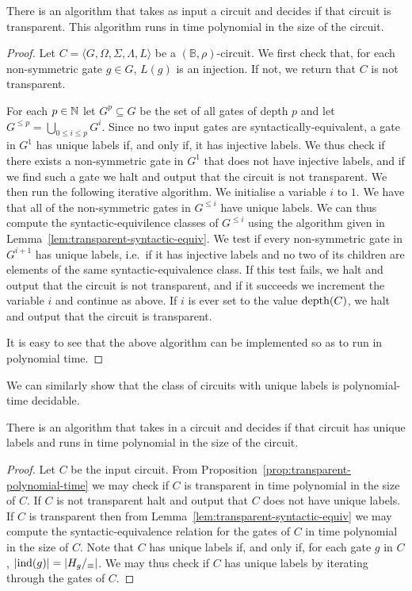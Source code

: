 \documentclass[../paper.tex]{subfiles}
\begin{document}
\begin{prop}
  There is an algorithm that takes as input a circuit and decides if that
  circuit is transparent. This algorithm runs in time polynomial in the size of
  the circuit.
  \label{prop:transparent-polynomial-time}
\end{prop}
\begin{proof}
  Let $C = \langle G, \Omega, \Sigma, \Lambda, L \rangle$ be a $(\mathbb{B},
  \rho)$-circuit. We first check that, for each non-symmetric gate $g \in G$,
  $L(g)$ is an injection. If not, we return that $C$ is not transparent.

  For each $p \in \mathbb{N}$ let $G^p \subseteq G$ be the set of all gates of depth
  $p$ and let $G^{\leq p} = \bigcup_{0 \leq i \leq p}G^i$. Since no two input
  gates are syntactically-equivalent, a gate in $G^1$ has unique labels if, and
  only if, it has injective labels. We thus check if there exists a
  non-symmetric gate in $G^1$ that does not have injective labels, and if we
  find such a gate we halt and output that the circuit is not transparent. We
  then run the following iterative algorithm. We initialise a variable $i$ to
  $1$. We have that all of the non-symmetric gates in $G^{\leq i}$ have unique
  labels. We can thus compute the syntactic-equivilence classes of $G^{\leq i}$
  using the algorithm given in Lemma~\ref{lem:transparent-syntactic-equiv}. We
  test if every non-symmetric gate in $G^{i+1}$ has unique labels, i.e.\ if
  it has injective labels and no two of its children are elements of the same
  syntactic-equivalence class. If this test fails, we halt and output that the
  circuit is not transparent, and if it succeeds we increment the variable $i$ and
  continue as above. If $i$ is ever set to the value $\text{depth}(C)$, we halt and
  output that the circuit is transparent.

  It is easy to see that the above algorithm can be implemented so as to run in
  polynomial time.
\end{proof}

We can similarly show that the class of circuits with unique labels is
polynomial-time decidable.

\begin{cor}
  There is an algorithm that takes in a circuit and decides if that circuit has
  unique labels and runs in time polynomial in the size of the circuit.
  \label{cor:unique-labels-polynomial-time}
\end{cor}
\begin{proof}
  Let $C$ be the input circuit. From
  Proposition~\ref{prop:transparent-polynomial-time} we may check if $C$ is
  transparent in time polynomial in the size of $C$. If $C$ is not transparent
  halt and output that $C$ does not have unique labels. If $C$ is transparent
  then from Lemma~\ref{lem:transparent-syntactic-equiv} we may compute the
  syntactic-equivalence relation for the gates of $C$ in time polynomial in the
  size of $C$. Note that $C$ has unique labels if, and only if, for each gate
  $g$ in $C$, $\vert \text{\upshape ind}(g) \vert = \vert H_g /_\equiv \vert$. We may thus
  check if $C$ has unique labels by iterating through the gates of $C$.
\end{proof}
\end{document}
